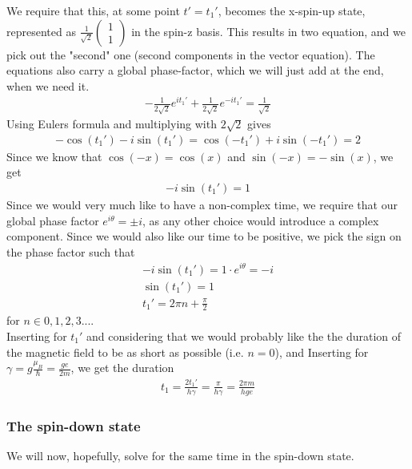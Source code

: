 \documentclass[12p,a4paper]{article}
\newcommand{\0}{\ket{0}}
\newcommand{\1}{\ket{1}}
\renewcommand{\exp}{e^}
\begin{document}
We require that this, at some point $t'=t_1'$, becomes the x-spin-up state, represented as $\frac{1}{\sqrt{2}}\begin{pmatrix} 1 \\ 1 \end{pmatrix}$ in the spin-z basis. This results in two equation, and we pick out the "second" one (second components in the vector equation). The equations also carry a global phase-factor, which we will just add at the end, when we need it.
\begin{align*}
    -\frac{1}{2\sqrt{2}}\exp{it_1'} + \frac{1}{2\sqrt{2}}\exp{-it_1'} = \frac{1}{\sqrt{2}}
\end{align*}
Using Eulers formula and multiplying with $2\sqrt{2}$ gives
\begin{align*}
    -\cos(t_1') -i\sin(t_1') = \cos(-t_1') + i\sin(-t_1') = 2
\end{align*}
Since we know that $\cos(-x) = \cos(x)$ and $\sin(-x) = -\sin(x)$, we get
\begin{align*}
    -i\sin(t_1') = 1
\end{align*}
Since we would very much like to have a non-complex time, we require that our global phase factor $\exp{i\theta} = \pm i$, as any other choice would introduce a complex component. Since we would also like our time to be positive, we pick the sign on the phase factor such that
\begin{align*}
    -i\sin(t_1') = 1\cdot \exp{i\theta} = -i \\
    \sin(t_1') = 1 \\
    t_1' = 2\pi n + \frac{\pi}{2}
\end{align*}
for $n\in {0,1,2,3...}$.\\
Inserting for $t_1'$ and considering that we would probably like the the duration of the magnetic field to be as short as possible (i.e. $n = 0$), and Inserting for $\gamma = g\frac{\mu_B}{\hbar} = \frac{ge}{2m}$, we get the duration
\begin{align*}
    t_1 = \frac{2t_1'}{h\gamma} = \frac{\pi}{h\gamma} = \frac{2\pi m}{h g e}
\end{align*}


\subsubsection*{The spin-down state}
We will now, hopefully, solve for the same time in the spin-down state.
\end{document}
